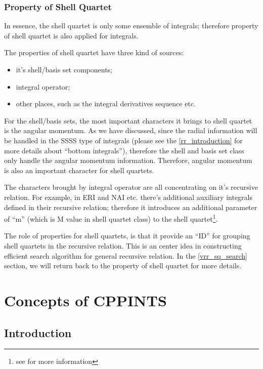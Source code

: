 \subsection{Property of Shell Quartet}
%
%
\label{property_sq}
In essence, the shell quartet is only some ensemble of integrals; therefore
property of shell quartet is also applied for integrals. 

The properties of shell quartet have three kind of sources: 
\begin{itemize}
 \item it's shell/basis set components;
 \item integral operator;
 \item other places, such as the integral derivatives sequence etc.
\end{itemize}

For the shell/basis sets, the most important characters it brings to shell
quartet is the angular momentum. As we have discussed, since the radial 
information will be handled in the SSSS type of integrals (please see the 
\ref{rr_introduction} for more details about ``bottom integrals''), therefore
the shell and basis set class only handle the angular momentum information.
Therefore, angular momentum is also an important character for shell quartets.

The characters brought by integral operator are all concentrating on it's 
recursive relation. For example, in ERI and NAI etc. there's additional 
auxiliary integrals defined in their recursive relation; therefore it 
introduces an additional parameter of ``m'' (which is M value in shell quartet
class) to the shell quartet\footnote{see \cite{OS1986} for more information}.

The role of properties for shell quartets, is that it provide an ``ID'' for 
grouping shell quartets in the recursive relation. This is an center idea
in constructing efficient search algorithm for general recursive relation.
In the \ref{vrr_sq_search} section, we will return back to the property of 
shell quartet for more details. 



\chapter{Concepts of CPPINTS}

\section{Introduction}

